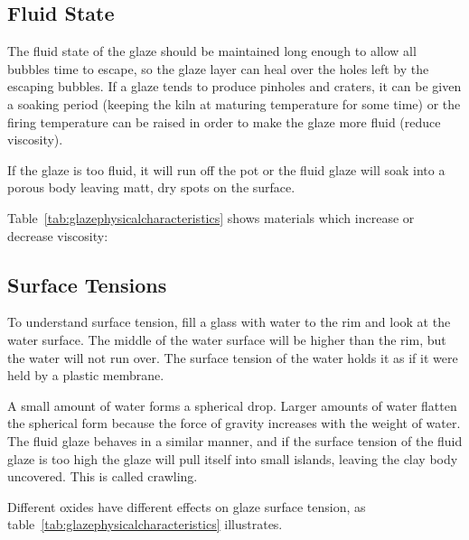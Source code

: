 \subsection{Fluid State}
The fluid state of the glaze should be maintained long enough to allow all 
bubbles time to escape, so the glaze layer can heal over the holes left by the 
escaping bubbles. If a glaze tends to produce pinholes and craters, it can be 
given a soaking period (keeping the kiln at maturing temperature for some time) 
or the firing temperature can be raised in order to make the glaze more fluid 
(reduce viscosity).

If the glaze is too fluid, it will run off the pot or the fluid glaze will soak 
into a porous body leaving matt, dry spots on the surface.

Table~\ref{tab:glazephysicalcharacteristics} shows materials which increase or 
decrease viscosity:
\subsection{Surface Tensions}
\label{sec:surfacetension}
To understand surface tension, fill a glass with water to the rim and look at 
the water surface. The middle of the water surface will be higher than the rim, 
but the water will not run over. The surface tension of the water holds it as 
if it were held by a plastic membrane.

A small amount of water forms a spherical drop. Larger amounts of water flatten 
the spherical form because the force of gravity increases with the weight of 
water. The fluid glaze behaves in a similar manner, and if the surface tension 
of the fluid glaze is too high the glaze will pull itself into small islands, 
leaving the clay body uncovered. This is called crawling.

Different oxides have different effects on glaze surface tension, as 
table~\ref{tab:glazephysicalcharacteristics} illustrates.

